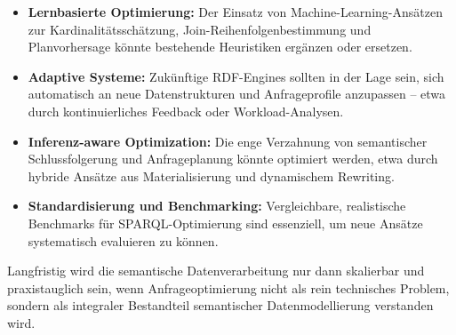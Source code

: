 \documentclass[12pt]{article}
\begin{document}
\begin{itemize}
    \item \textbf{Lernbasierte Optimierung:} Der Einsatz von Machine-Learning-Ansätzen zur Kardinalitätsschätzung, Join-Reihenfolgenbestimmung und Planvorhersage könnte bestehende Heuristiken ergänzen oder ersetzen.
    
    \item \textbf{Adaptive Systeme:} Zukünftige RDF-Engines sollten in der Lage sein, sich automatisch an neue Datenstrukturen und Anfrageprofile anzupassen – etwa durch kontinuierliches Feedback oder Workload-Analysen.
    
    \item \textbf{Inferenz-aware Optimization:} Die enge Verzahnung von semantischer Schlussfolgerung und Anfrageplanung könnte optimiert werden, etwa durch hybride Ansätze aus Materialisierung und dynamischem Rewriting.
    
    \item \textbf{Standardisierung und Benchmarking:} Vergleichbare, realistische Benchmarks für SPARQL-Optimierung sind essenziell, um neue Ansätze systematisch evaluieren zu können.
\end{itemize}

Langfristig wird die semantische Datenverarbeitung nur dann skalierbar und praxistauglich sein, wenn Anfrageoptimierung nicht als rein technisches Problem, sondern als integraler Bestandteil semantischer Datenmodellierung verstanden wird.


\printbibliography
\end{document}
